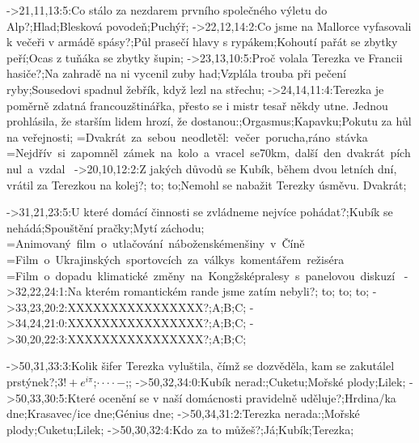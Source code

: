 
->21,11,13:5:Co stálo za nezdarem prvního společného výletu do Alp?;Hlad;Blesková povodeň;Puchýř;%
->22,12,14:2:Co jsme na Mallorce vyfasovali k večeři v armádě spásy?;Půl prasečí hlavy s rypákem;Kohoutí pařát se zbytky peří;Ocas z tuňáka se zbytky šupin;%
->23,13,10:5:Proč volala Terezka ve Francii hasiče?;Na zahradě na ni vycenil zuby had;Vzplála trouba při pečení ryby;Sousedovi spadnul žebřík, když lezl na střechu;%
->24,14,11:4:Terezka je poměrně zdatná francouzštinářka, přesto se i mistr tesař někdy utne. Jednou prohlásila, že starším lidem hrozí, že dostanou:;Orgasmus;Kapavku;Pokutu za hůl na veřejnosti;%
    =\vbox{\questionfont\baselineskip=32pt\hbox{Dvakrát za sebou neodletěl: večer porucha,}\hbox{ráno stávka}\hbox{~}}
    =\vbox{\questionfont\baselineskip=32pt\hbox{Nejdřív si zapomněl zámek na kolo a vracel se}\hbox{70km, další den dvakrát píchnul a vzdal}\hbox{~}}
->20,10,12:2:Z jakých důvodů se Kubík, během dvou letních dní, vrátil za Terezkou na kolej?;{ \vbox to};{ \vbox to};Nemohl se nabažit Terezky úsměvu. Dvakrát;%

->31,21,23:5:U které domácí činnosti se zvládneme nejvíce pohádat?;Kubík se nehádá;Spouštění pračky;Mytí záchodu;%
    =\vbox{\questionfont\baselineskip=32pt\hbox{Animovaný film o utlačování náboženské}\hbox{menšiny v Číně}\hbox{~}}
    =\vbox{\questionfont\baselineskip=32pt\hbox{Film o Ukrajinských sportovcích za války}\hbox{s komentářem režiséra}\hbox{~}}
    =\vbox{\questionfont\baselineskip=32pt\hbox{Film o dopadu klimatické změny na Kongžské}\hbox{pralesy s panelovou diskuzí}\hbox{~}}
->32,22,24:1:Na kterém romantickém rande jsme zatím nebyli?;{ \vbox to};{ \vbox to};{ \vbox to};%
->33,23,20:2:XXXXXXXXXXXXXXXX?;A;B;C;%
->34,24,21:0:XXXXXXXXXXXXXXXX?;A;B;C;%
->30,20,22:3:XXXXXXXXXXXXXXXX?;A;B;C;%

->50,31,33:3:Kolik šifer Terezka vyluštila, čímž se doz\-vě\-dě\-la, kam se zakutálel prstýnek?;$3! + e^{i\pi}$;$\cdot\cdot\cdot\cdot-$;;%
->50,32,34:0:Kubík nerad:;Cuketu;Mořské plody;Lilek;%
->50,33,30:5:Které ocenění se v naší domácnosti pravidelně uděluje?;Hrdina/ka dne;Krasavec/ice dne;Génius dne;%
->50,34,31:2:Terezka nerada:;Mořské plody;Cuketu;Lilek;%
->50,30,32:4:Kdo za to můžeš?;Já;Kubík;Terezka;%

